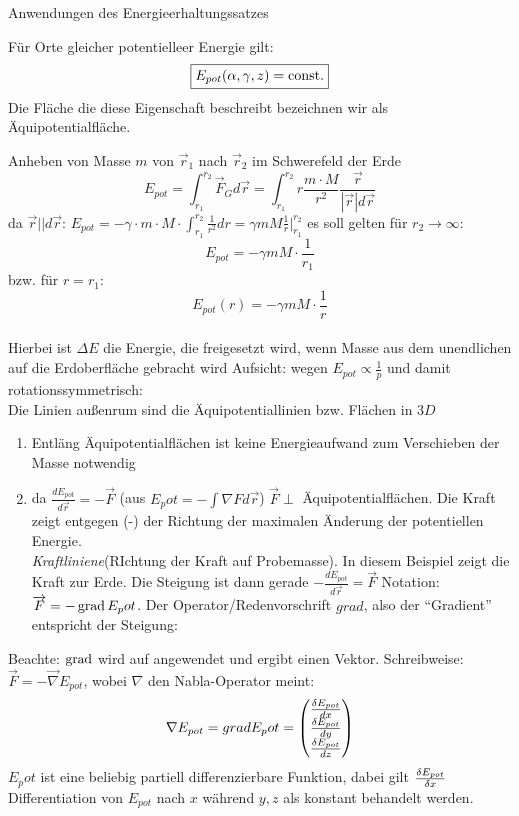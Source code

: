 \documentclass[a4paper,10pt]{scrartcl}
\begin{document}
\begin{seg}{Anwendungen des Energieerhaltungssatzes}
\begin{enumerate}[a)]
 Für Orte gleicher potentielleer Energie gilt:
\[
 \boxed{E_{pot}(\alpha,\gamma, z)=\text{const}.}
\]
Die Fläche die diese Eigenschaft beschreibt bezeichnen wir als Äquipotentialfläche.
 \begin{ex*}
 Anheben von Masse $m$ von $\vec r_1$ nach $\vec r_2$ im Schwerefeld der Erde
\[
 E_{pot}=\int_{r_1}^{r_2} \vec F_G d\vec{r}=\int_{r_1}^{r_2} r \frac{m\cdot M}{r^2}\frac{\vec r}{|\vec r| d\vec{r}}
\]
da $\vec r||d\vec r$: $E_{pot}=-\gamma\cdot m\cdot M\cdot \int_{r_1}^{r_2}\frac{1}{r^2} dr=\gamma mM\frac{1}{r}|_{r_1}^{r_2}$
 es soll gelten für $r_2\to \infty$:
\[
 \boxed{E_{pot}=-\gamma m M \cdot \frac{1}{r_1}}
\]
bzw. für $r=r_1$:
 \[
  \boxed{E_{pot}(r)=-\gamma m M \cdot \frac{1}{r}}
 \]
\\
Hierbei ist $\Delta E$ die Energie, die freigesetzt wird, wenn Masse aus dem unendlichen auf die Erdoberfläche gebracht wird
Aufsicht:
wegen $E_{pot} \propto \frac{1}{p}$ und damit rotationssymmetrisch:\\
Die Linien außenrum sind die Äquipotentiallinien bzw. Flächen in $3D$
\begin{enumerate}
\item Entläng Äquipotentialflächen ist keine Energieaufwand zum Verschieben der Masse notwendig
\item da $\frac{dE_{pot}}{d\vec{r}}=-\vec F$ (aus $E_pot=-\int \nabla F d\vec r$) 
$\vec F\perp$ Äquipotentialflächen. Die Kraft zeigt entgegen (-) der Richtung der maximalen Änderung der potentiellen Energie.\\
\emph{Kraftliniene}(RIchtung der Kraft auf Probemasse). In diesem Beispiel zeigt die Kraft zur Erde.
Die Steigung ist dann gerade $-\frac{d E_{pot}}{d\vec{r}}=\vec F$
Notation: $\overrightarrow{F}=-\operatorname{grad}{E_pot}$. Der Operator/Redenvorschrift $grad$, also der "`Gradient"' entspricht der Steigung:
\end{enumerate}
 Beachte: $\operatorname{grad}$ wird auf angewendet und ergibt einen Vektor. Schreibweise: $\vec F=-\vec \nabla E_{pot}$, wobei $\nabla$ den Nabla-Operator meint:
\[
 \nabla E_{pot}=grad E_pot=\begin{pmatrix} \frac{\delta E_{pot}}{dx}\\ \frac{\delta E_{pot}}{dy}\\ \frac{\delta E_{pot}}{dz} \end{pmatrix}
\]
$E_pot$ ist eine beliebig partiell differenzierbare Funktion, dabei gilt $\frac{\delta E_{pot}}{\delta x}$ Differentiation von  $E_{pot}$ nach $x$ während $y, z$ als konstant behandelt werden. 

\end{ex*}
\end{enumerate}
\end{seg}
\end{document}
